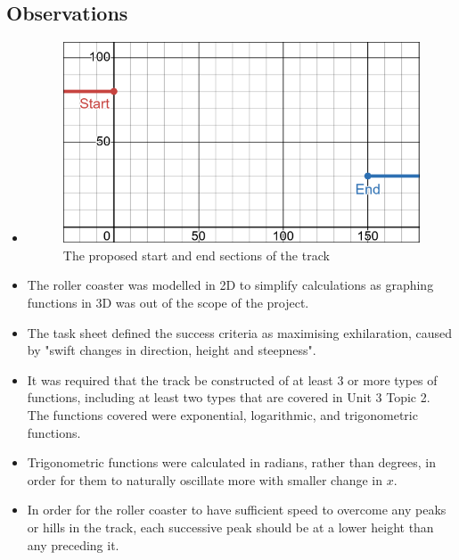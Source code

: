\documentclass[11pt, letterpaper]{article}
\begin{document}
\subsection{Observations}
\begin{itemize}

	\item 

		\begin{figure}[h]
		
		\begin{center}
		\includegraphics[width=15cm]{Start and End.png}

		\caption{The proposed start and end sections of the track}
		\end{center}


		\end{figure}

	\item The roller coaster was modelled in 2D to simplify calculations as graphing functions in 3D was out of the scope of the project. 
	\item The task sheet defined the success criteria as maximising exhilaration, caused by "swift changes in direction, height and steepness". 
		
	\item It was required that the track be constructed of at least 3 or more types of functions, including at least two types that are covered in Unit 3 Topic 2. The functions covered were exponential, logarithmic, and trigonometric functions.
	
	\item Trigonometric functions were calculated in radians, rather than degrees, in order for them to naturally oscillate more with smaller change in $x$.
	\item In order for the roller coaster to have sufficient speed to overcome any peaks or hills in the track, each successive peak should be at a lower height than any preceding it.

\end{itemize}
\end{document}
